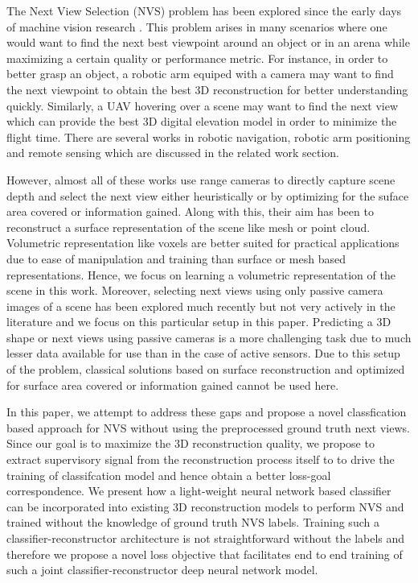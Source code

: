 The Next View Selection (NVS) problem has been explored since the early days of machine vision research \cite{connolly1985determination}.
This problem arises in many scenarios where one would want to find the next best viewpoint around an object or in an arena while maximizing a certain quality or performance metric.
For instance, in order to better grasp an object, a robotic arm equiped with a camera may want to find the next viewpoint to obtain the best 3D reconstruction for better understanding quickly.
Similarly, a UAV hovering over a scene may want to find the next view which can provide the best 3D digital elevation model in order to minimize the flight time.
There are several works in robotic navigation, robotic arm positioning and remote sensing which are discussed in the related work section.

However, almost all of these works use range cameras to directly capture scene depth and select the next view either heuristically or by optimizing for the suface area covered or information gained.
Along with this, their aim has been to reconstruct a surface representation of the scene like mesh or point cloud.
Volumetric representation like voxels are better suited for practical applications due to ease of manipulation and training than surface or mesh based representations.
Hence, we focus on learning a volumetric representation of the scene in this work.
Moreover, selecting next views using only passive camera images of a scene has been explored much recently but not very actively in the literature and we focus on this particular setup in this paper.
Predicting a 3D shape or next views using passive cameras is a more challenging task due to much lesser data available for use than in the case of active sensors.
Due to this setup of the problem, classical solutions based on surface reconstruction and optimized for surface area covered or information gained cannot be used here.

In this paper, we attempt to address these gaps and propose a novel classfication based approach for NVS without using the preprocessed ground truth next views.
Since our goal is to maximize the 3D reconstruction quality, we propose to extract supervisory signal from the reconstruction process itself to to drive the training of classifcation model and hence obtain a better loss-goal correspondence.
We present how a light-weight neural network based classifier can be incorporated into existing 3D reconstruction models to perform NVS and trained without the knowledge of ground truth NVS labels.
Training such a classifier-reconstructor architecture is not straightforward without the labels and therefore we propose a novel loss objective that facilitates end to end training of such a joint classifier-reconstructor deep neural network model.


